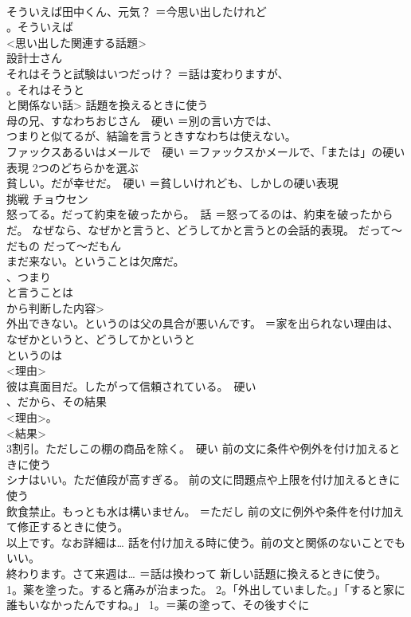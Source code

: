 \documentclass[8pt]{extreport}
\begin{document}
\begin{CJK}{UTF8}{min}
\\	そういえば田中くん、元気？	＝今思い出したけれど 
\\	。そういえば
\\	<思い出した関連する話題>
\\	設計士さん	
\\	それはそうと試験はいつだっけ？	＝話は変わりますが、
\\	。それはそうと
\\	と関係ない話> 話題を換えるときに使う
\\	母の兄、すなわちおじさん　硬い	＝別の言い方では、
\\	つまりと似てるが、結論を言うときすなわちは使えない。
\\	ファックスあるいはメールで　硬い	＝ファックスかメールで、「または」の硬い表現 2つのどちらかを選ぶ
\\	貧しい。だが幸せだ。　硬い	＝貧しいけれども、しかしの硬い表現
\\	挑戦	チョウセン 
\\	怒ってる。だって約束を破ったから。　話	＝怒ってるのは、約束を破ったからだ。 なぜなら、なぜかと言うと、どうしてかと言うとの会話的表現。 だって〜だもの だって〜だもん
\\	まだ来ない。ということは欠席だ。	
\\	、つまり 
\\	と言うことは
\\	から判断した内容>
\\	外出できない。というのは父の具合が悪いんです。	＝家を出られない理由は、なぜかというと、どうしてかというと 
\\	というのは
\\	<理由>
\\	彼は真面目だ。したがって信頼されている。　硬い	
\\	、だから、その結果 
\\	<理由>。
\\	<結果>
\\	3割引。ただしこの棚の商品を除く。　硬い	前の文に条件や例外を付け加えるときに使う
\\	シナはいい。ただ値段が高すぎる。	前の文に問題点や上限を付け加えるときに使う
\\	飲食禁止。もっとも水は構いません。	＝ただし 前の文に例外や条件を付け加えて修正するときに使う。
\\	以上です。なお詳細は…	話を付け加える時に使う。前の文と関係のないことでもいい。
\\	終わります。さて来週は…	＝話は換わって 新しい話題に換えるときに使う。
\\	1。薬を塗った。すると痛みが治まった。 2。「外出していました。」「すると家に誰もいなかったんですね。」	1。＝薬の塗って、その後すぐに 　　

\end{CJK}
\end{document}
